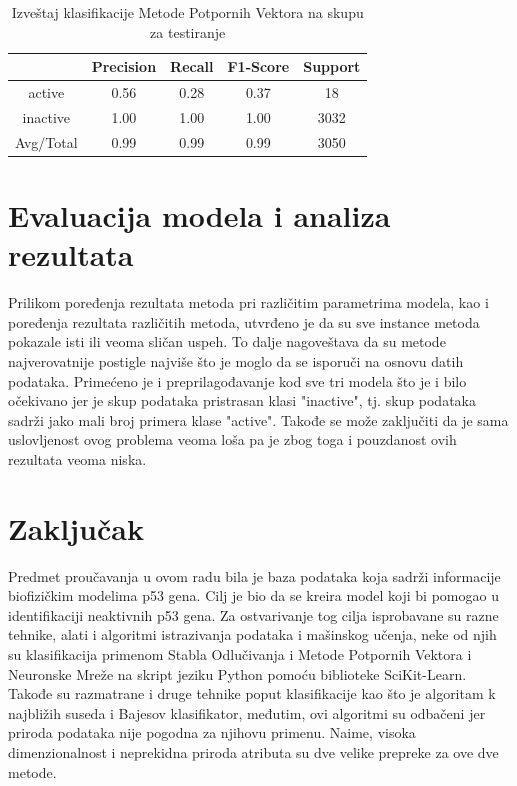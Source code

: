\documentclass[12pt]{article}
\begin{document}
\begin{table}
\caption{Izveštaj klasifikacije Metode Potpornih Vektora na skupu za testiranje}
\centering
\begin{tabular}{|c|c|c|c|c|}
        	\hline
	& Precision & Recall & F1-Score & Support \\
        	\hline
	active & 0.56 & 0.28 & 0.37 & 18 \\
        	\hline
	inactive & 1.00 & 1.00 & 1.00 & 3032 \\
        	\hline
	Avg/Total & 0.99 & 0.99 & 0.99 & 3050 \\
	\hline
\end{tabular}
\end{table}


\newpage
\section {Evaluacija modela i analiza rezultata}
Prilikom poređenja rezultata metoda pri različitim parametrima modela, kao i poređenja rezultata različitih metoda, utvrđeno je da su sve instance metoda pokazale isti ili veoma sličan uspeh. To dalje nagoveštava da su metode najverovatnije postigle najviše što je moglo da se isporuči na osnovu datih podataka. Primećeno je i preprilagođavanje kod sve tri modela što je i bilo očekivano jer je skup podataka pristrasan klasi "inactive", tj. skup podataka sadrži jako mali broj primera klase "active". Takođe se može zaključiti da je sama uslovljenost ovog problema veoma loša pa je zbog toga i pouzdanost ovih rezultata veoma niska. 

\section {Zaključak}
Predmet proučavanja u ovom radu bila je baza podataka koja sadrži informacije biofizičkim modelima p53 gena. Cilj je bio da se kreira model koji bi pomogao u identifikaciji neaktivnih p53 gena. Za ostvarivanje tog cilja isprobavane su razne tehnike, alati i algoritmi istrazivanja podataka i mašinskog učenja, neke od njih su klasifikacija primenom Stabla Odlučivanja i Metode Potpornih Vektora i Neuronske Mreže na skript jeziku Python pomoću biblioteke SciKit-Learn. Takođe su razmatrane i druge tehnike poput klasifikacije kao što je algoritam k najbližih suseda i Bajesov klasifikator, međutim, ovi algoritmi su odbačeni jer priroda podataka nije pogodna za njihovu primenu. Naime, visoka dimenzionalnost i neprekidna priroda atributa su dve velike prepreke za ove dve metode.
\end{document}
